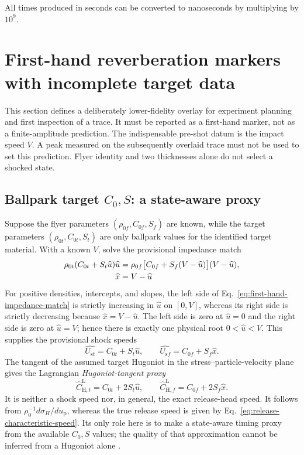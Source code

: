 \documentclass[11pt]{article}
\newcommand{\rhoz}[1][]{\rho_{0#1}}
\newcommand{\Us}[1][]{U_{\mathrm{s}#1}}
\newcommand{\up}[1][]{u_{\mathrm{p}#1}}
\newcommand{\sig}{\sigma}
\begin{document}
All times produced in seconds can be converted to nanoseconds by multiplying
by $10^9$.

\section{First-hand reverberation markers with incomplete target data}
\label{sec:first-hand-markers}

This section defines a deliberately lower-fidelity overlay for experiment
planning and first inspection of a trace.  It must be reported as a
first-hand marker, not as a finite-amplitude prediction.  The indispensable
pre-shot datum is the impact speed $V$.  A peak measured on the subsequently
overlaid trace must not be used to set this prediction.  Flyer identity and
two thicknesses alone do not select a shocked state.

\subsection{Ballpark target $C_0,S$: a state-aware proxy}

Suppose the flyer parameters $(\rhoz[f],C_{0f},S_f)$ are known, while the
target parameters $(\rhoz[t],C_{0t},S_t)$ are only ballpark values for the
identified target material.  With a known $V$, solve the provisional impedance
match
\begin{align}
  \rhoz[t](C_{0t}+S_t\widehat u)\widehat u
  &=\rhoz[f]\bigl[C_{0f}+S_f(V-\widehat u)\bigr]
    (V-\widehat u),
  \label{eq:first-hand-impedance-match}\\
  \widehat x&=V-\widehat u \notag
\end{align}
For positive densities, intercepts, and slopes, the left side of
Eq.~\eqref{eq:first-hand-impedance-match} is strictly increasing in
$\widehat u$ on $[0,V]$, whereas its right side is strictly decreasing
because $\widehat x=V-\widehat u$.  The left side is zero at
$\widehat u=0$ and the right side is zero at $\widehat u=V$; hence there is
exactly one physical root $0<\widehat u<V$.  This supplies the
provisional shock speeds
\begin{equation}
  \widehat{\Us[t]}=C_{0t}+S_t\widehat u,
  \qquad
  \widehat{\Us[f]}=C_{0f}+S_f\widehat x.
  \label{eq:first-hand-shock-speeds}
\end{equation}
The tangent of the assumed target Hugoniot in the stress--particle-velocity
plane gives the Lagrangian \emph{Hugoniot-tangent proxy}
\begin{equation}
  \widehat C_{\mathrm{H},t}^{\mathrm L}=C_{0t}+2S_t\widehat u,
  \qquad
  \widehat C_{\mathrm{H},f}^{\mathrm L}=C_{0f}+2S_f\widehat x.
  \label{eq:hugoniot-tangent-proxy}
\end{equation}
It is neither a shock speed nor, in general, the exact release-head speed.
It follows from $\rhoz^{-1}d\sig_H/d\up$, whereas the true release speed is
given by Eq.~\eqref{eq:release-characteristic-speed}.  Its only role here is
to make a state-aware timing proxy from the available $C_0,S$ values; the
quality of that approximation cannot be inferred from a Hugoniot alone
\cite{LyzengaAhrens1978,Kerley2008}.
\end{document}
